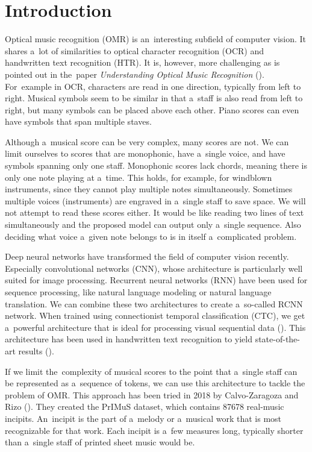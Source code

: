 \chapter{Introduction}
\label{chap:Introduction}

Optical music recognition (OMR) is an~interesting subfield of computer vision. It shares a~lot of similarities to optical character recognition (OCR) and handwritten text recognition (HTR). It is, however, more challenging as is pointed out in the~paper \emph{Understanding Optical Music Recognition} (\cite{CalvoZaragozaHajic}). For~example in OCR, characters are read in one direction, typically from left to right. Musical symbols seem to be similar in that a~staff is also read from left to right, but many symbols can be placed above each other. Piano scores can even have symbols that span multiple staves.

Although a~musical score can be very complex, many scores are not. We can limit ourselves to scores that are monophonic, have a~single voice, and have symbols spanning only one staff. Monophonic scores lack chords, meaning there is only one note playing at a~time. This holds, for example, for windblown instruments, since they cannot play multiple notes simultaneously. Sometimes multiple voices (instruments) are engraved in a~single staff to save space. We will not attempt to read these scores either. It would be like reading two lines of text simultaneously and the proposed model can output only a~single sequence. Also deciding what voice a~given note belongs to is in itself a~complicated problem.

Deep neural networks have transformed the field of computer vision recently. Especially convolutional networks (CNN), whose architecture is particularly well suited for image processing. Recurrent neural networks (RNN) have been used for sequence processing, like natural language modeling or natural language translation. We can combine these two architectures to create a~so-called RCNN network. When trained using connectionist temporal classification (CTC), we get a~powerful architecture that is ideal for processing visual sequential data (\cite{Puigcerver}). This architecture has been used in handwritten text recognition to yield state-of-the-art results (\cite{Scheidl}).

If we limit the~complexity of musical scores to the point that a~single staff can be represented as a~sequence of tokens, we can use this architecture to tackle the problem of OMR. This approach has been tried in 2018 by Calvo-Zaragoza and Rizo (\cite{Primus}). They created the PrIMuS dataset, which contains 87678 real-music incipits. An~incipit is the part of a~melody or a~musical work that is most recognizable for that work. Each incipit is a~few measures long, typically shorter than a~single staff of printed sheet music would be.

